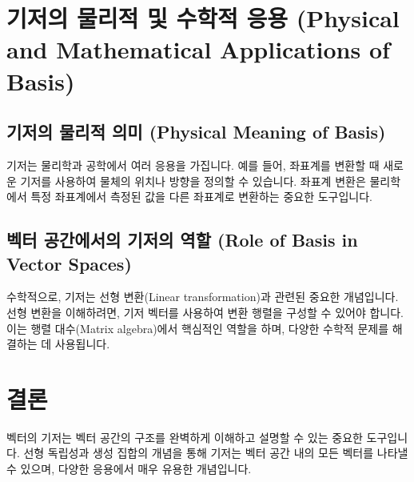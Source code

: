 \documentclass[12pt]{article}
\begin{document}
\section{기저의 물리적 및 수학적 응용 (Physical and Mathematical Applications of Basis)}

\subsection{기저의 물리적 의미 (Physical Meaning of Basis)}

\noindent 기저는 물리학과 공학에서 여러 응용을 가집니다. 예를 들어, 좌표계를 변환할 때 새로운 기저를 사용하여 물체의 위치나 방향을 정의할 수 있습니다. 좌표계 변환은 물리학에서 특정 좌표계에서 측정된 값을 다른 좌표계로 변환하는 중요한 도구입니다.

\subsection{벡터 공간에서의 기저의 역할 (Role of Basis in Vector Spaces)}

\noindent 수학적으로, 기저는 선형 변환(Linear transformation)과 관련된 중요한 개념입니다. 선형 변환을 이해하려면, 기저 벡터를 사용하여 변환 행렬을 구성할 수 있어야 합니다. 이는 행렬 대수(Matrix algebra)에서 핵심적인 역할을 하며, 다양한 수학적 문제를 해결하는 데 사용됩니다.

\section{결론}

\noindent 벡터의 기저는 벡터 공간의 구조를 완벽하게 이해하고 설명할 수 있는 중요한 도구입니다. 선형 독립성과 생성 집합의 개념을 통해 기저는 벡터 공간 내의 모든 벡터를 나타낼 수 있으며, 다양한 응용에서 매우 유용한 개념입니다.
\end{document}
